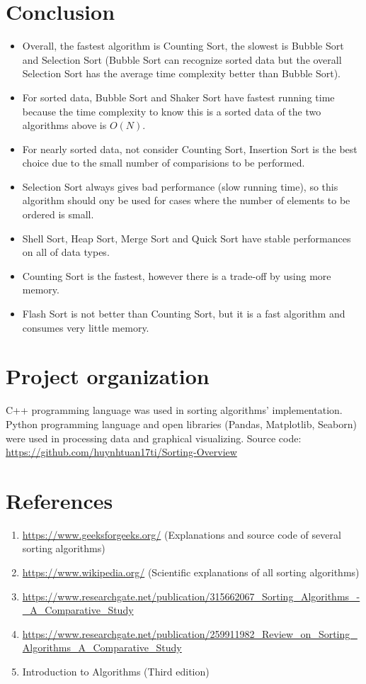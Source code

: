 \documentclass[11pt,a4paper]{article}
\begin{document}
\section{Conclusion}
\begin{itemize}
\item Overall, the fastest algorithm is Counting Sort, the slowest is Bubble Sort and Selection Sort (Bubble Sort can recognize sorted data but the 
overall Selection Sort has the average time complexity better than Bubble Sort).
\item For sorted data, Bubble Sort and Shaker Sort have fastest running time because the time complexity to know this is a sorted data of the two algorithms above is $O(N)$.
\item For nearly sorted data, not consider Counting Sort, Insertion Sort is the best choice due to the small number of comparisions to be performed.
\item Selection Sort always gives bad performance (slow running time), so this algorithm should ony be used for cases where the number of elements to 
be ordered is small.
\item Shell Sort, Heap Sort, Merge Sort and Quick Sort have stable performances on all of data types.
\item Counting Sort is the fastest, however there is a trade-off by using more memory.
\item Flash Sort is not better than Counting Sort, but it is a fast algorithm and consumes very little memory.
\end{itemize}

\section{Project organization}
C++ programming language was used in sorting algorithms' implementation.
Python programming language and open libraries (Pandas, Matplotlib, Seaborn) were used in processing data and graphical visualizing.
\newline
Source code: \url{https://github.com/huynhtuan17ti/Sorting-Overview}

\section{References}
\begin{enumerate}
  \item \url{https://www.geeksforgeeks.org/} (Explanations and source code of several sorting algorithms)\\
  \item \url{https://www.wikipedia.org/} (Scientific explanations of all sorting algorithms)\\
  \item \url{https://www.researchgate.net/publication/315662067_Sorting_Algorithms_-_A_Comparative_Study}\\
  \item \url{https://www.researchgate.net/publication/259911982_Review_on_Sorting_Algorithms_A_Comparative_Study}\\
  \item Introduction to Algorithms (Third edition)\\
\end{enumerate}
\end{document}

